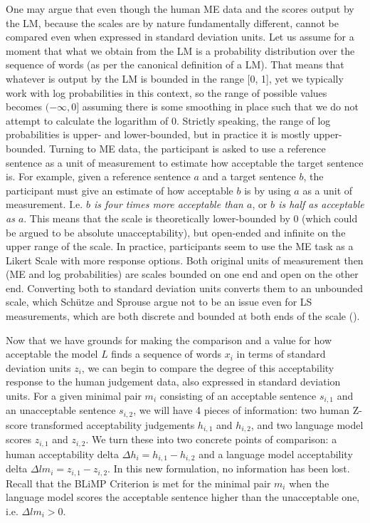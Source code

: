 One may argue that even though the human ME data and the scores output by the LM, because the scales are by nature fundamentally different, cannot be compared even when expressed in standard deviation units.  Let us assume for a moment that what we obtain from the LM is a probability distribution over the sequence of words (as per the canonical definition of a LM).  That means that whatever is output by the LM is bounded in the range [0, 1], yet we typically work with log probabilities in this context, so the range of possible values becomes $(-\infty, 0]$ assuming there is some smoothing in place such that we do not attempt to calculate the logarithm of 0.  Strictly speaking, the range of log probabilities is upper- and lower-bounded, but in practice it is mostly upper-bounded. Turning to ME data, the participant is asked to use a reference sentence as a unit of measurement to estimate how acceptable the target sentence is.  For example, given a reference sentence $a$ and a target sentence $b$, the participant must give an estimate of how acceptable $b$ is by using $a$ as a unit of measurement.  I.e. \textit{$b$ is four times more acceptable than $a$}, or \textit{$b$ is half as acceptable as $a$}. This means that the scale is theoretically lower-bounded by 0 (which could be argued to be absolute unacceptability), but open-ended and infinite on the upper range of the scale.  In practice, participants seem to use the ME task as a Likert Scale with more response options.  Both original units of measurement then (ME and log probabilities) are scales bounded on one end and open on the other end.  Converting both to standard deviation units converts them to an unbounded scale, which Sch\"utze and Sprouse argue not to be an issue even for LS measurements, which are both discrete and bounded at both ends of the scale (\citealp{sprouse2011test,schutze}).

Now that we have grounds for making the comparison and a value for how acceptable the model $L$ finds a sequence of words $x_i$ in terms of standard deviation units $z_i$, we can begin to compare the degree of this acceptability response to the human judgement data, also expressed in standard deviation units.  For a given minimal pair $m_i$ consisting of an acceptable sentence $s_{i,1}$ and an unacceptable sentence $s_{i,2}$, we will have 4 pieces of information: two human Z-score transformed acceptability judgements $h_{i,1}$ and $h_{i,2}$, and two language model scores $z_{i,1}$ and $z_{i,2}$.  We turn these into two concrete points of comparison: a human acceptability delta $\Delta h_{i} = h_{i,1} - h_{i,2}$ and a language model acceptability delta $\Delta lm_i = z_{i,1} - z_{i,2}$.  In this new formulation, no information has been lost.  Recall that the BLiMP Criterion is met for the minimal pair $m_i$ when the language model scores the acceptable sentence higher than the unacceptable one, i.e. $\Delta lm_i > 0$.


